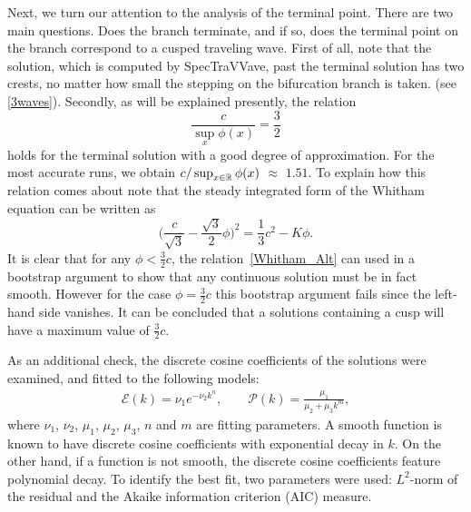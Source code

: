 Next, we turn our attention to the analysis of the terminal point. There
are two main questions. Does the branch terminate, and if so, 
does the terminal point on the branch correspond to a cusped traveling wave.
First of all, note that the solution, which is computed by \textsf{SpecTraVVave}, 
past the terminal solution has two crests, no matter how small the 
stepping on the bifurcation branch is taken.
(see \autoref{3waves}).   
Secondly, as will be explained presently, the relation 
\begin{equation*}
\frac{c}{\sup_{x} \phi(x)} = \frac{3}{2} 
\end{equation*}
holds for the terminal solution with a good degree of approximation.
For the most accurate runs, we obtain $c / \sup_{x \in \mathbb{R}} \phi(x)$ $\approx$ $1.51$. 
%
To explain how this relation comes about note that the steady integrated form of the
Whitham equation can be written as
\begin{equation}\label{Whitham_Alt}
\Big( \frac{c}{\sqrt{3}} - \frac{\sqrt{3}}{2}\phi \Big)^{2}  = \frac{1}{3} c^2 - K \phi.
\end{equation}
It is clear that for any $\phi < \frac{3}{2} c$, the relation~\eqref{Whitham_Alt}
can used in a bootstrap argument to show that any continuous solution must be
in fact smooth. However for the case $\phi =  \frac{3}{2} c$ this bootstrap
argument fails since the left-hand side vanishes. It can be concluded that
a solutions containing a cusp will have a maximum  value of $\frac{3}{2} c$.


	
As an additional check, the discrete cosine coefficients of the solutions were
examined, and fitted to the following models:
\begin{align*}
	\mathcal{E}(k) = \nu_1 e^{-\nu_2 k^n}, \qquad 
	\mathcal{P}(k) = \frac{\mu_1}{\mu_2 + \mu_3 k^m},
\end{align*}
%
where $\nu_1$, $\nu_2$, $\mu_1$, $\mu_2$, $\mu_3$, $n$ and $m$ are fitting parameters. 
A smooth function is known to have discrete cosine coefficients with exponential decay in $k$. 
On the other hand, if a function is not smooth, the discrete cosine coefficients feature polynomial decay. 
To identify the best fit, two parameters were used: $L^2$-norm of the residual 
and the Akaike information criterion (AIC) measure. 

